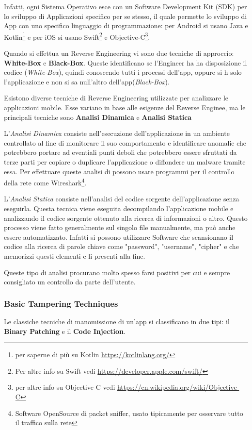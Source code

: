 \documentclass{article}
\begin{document}
Infatti, ogni Sistema Operativo esce con un Software Development Kit (SDK) per lo sviluppo di Applicazioni specifico per se stesso, il quale
permette lo sviluppo di App con uno specifico linguaggio di programmazione: per Android si usano Java e Kotlin\footnote{per saperne di 
più su Kotlin \url{https://kotlinlang.org/}} e per iOS si usano Swift\footnote{Per altre info su Swift vedi \url{https://developer.apple.com/swift/}} 
e Objective-C\footnote{per altre info su Objective-C vedi \url{https://en.wikipedia.org/wiki/Objective-C}}.

Quando si effettua un Reverse Engineering vi sono due tecniche di approccio: \textbf{White-Box} e \textbf{Black-Box}. Queste identificano se l'Engineer ha ha disposizione 
il codice (\textit{White-Box}), quindi conoscendo tutti i processi dell'app, oppure si h solo l'applicazione e non si sa null'altro dell'app(\textit{Black-Box}).

Esistono diverse tecniche di Reverse Engineering utilizzate per analizzare le applicazioni mobile. Esse variano in base alle esigenze del 
Reverse Enginee, ma le principali tecniche sono \textbf{Analisi Dinamica} e \textbf{Analisi Statica}

L'\textit{Analisi Dinamica} consiste nell'esecuzione dell'applicazione in un ambiente controllato al fine di monitorare il suo comportamento e 
identificare anomalie che potrebbero portare ad eventiali punti deboli che potrebbero essere sfruttati da terze parti per copiare o duplicare l'applicazione o diffondere un malware tramite essa.
Per effettuare queste analisi di possono usare programmi per il controllo della rete come Wireshark\footnote{Software OpenSource di packet sniffer, usato tipicamente per osservare tutto il traffico sulla rete}\cite{wireshark}.

L'\textit{Analisi Statica} consiste nell'analisi del codice sorgente dell'applicazione senza eseguirla. Questa tecnica viene eseguita decompilando l'applicazione mobile e analizzando il codice sorgente 
ottenuto alla ricerca di informazioni o altro. Questo processo viene fatto generalmente sul singolo file manualmente, ma può anche essere automatizzato. Infatti si possono utilizzare Software 
che scansionano il codice alla ricerca di parole chiave come "password", "username", "cipher" e che memorizzi questi elementi e li presenti alla fine. 

Queste tipo di analisi procurano molto spesso 
farsi positivi per cui e sempre consigliato un controllo da parte dell'utente.

\subsubsection{Basic Tampering Techniques}
Le classiche tecniche di manomissione di un'app si classificano in due tipi: il \textbf{Binary Patching} e il \textbf{Code Injection}.
\end{document}
